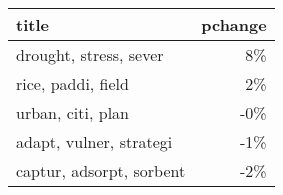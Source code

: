 \begin{tabular}{lr}
\toprule
                    title &  pchange \\
\midrule
   drought, stress, sever &       8\% \\
       rice, paddi, field &       2\% \\
        urban, citi, plan &      -0\% \\
  adapt, vulner, strategi &      -1\% \\
 captur, adsorpt, sorbent &      -2\% \\
\bottomrule
\end{tabular}
